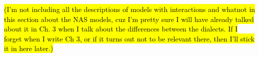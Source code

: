     \hl{(I'm not including all the descriptions of models with interactions and whatnot in this section about the NAS models, cuz I'm pretty sure I will have already talked about it in Ch. 3 when I talk about the differences between the dialects. If I forget when I write Ch 3, or if it turns out not to be relevant there, then I'll stick it in here later.)} %
    

